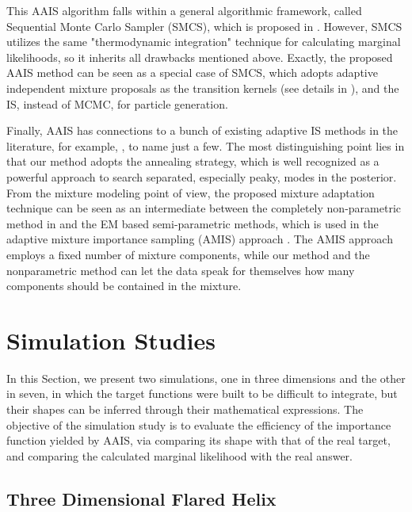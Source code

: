 \documentclass[aoas]{imsart}
\begin{document}
This AAIS algorithm falls within a general algorithmic framework,
called Sequential Monte Carlo Sampler (SMCS), which is proposed in
\cite{del2007sequential,del2006sequential}. However, SMCS utilizes
the same "thermodynamic integration" technique for calculating
marginal likelihoods, so it inherits all drawbacks mentioned above.
Exactly, the proposed AAIS method can be seen as a special case of
SMCS, which adopts adaptive independent mixture proposals as the
transition kernels (see details in
\cite{del2007sequential,del2006sequential}), and the IS, instead of
MCMC, for particle generation.

Finally, AAIS has connections to a bunch of existing adaptive IS
methods in the literature, for example,
\cite{evans1991chaining,oh1993imf,cappe2008ais,cappe2004pmc,west1993mixture,ardia2008adaptive},
to name just a few. The most distinguishing point lies in that our
method adopts the annealing strategy, which is well recognized as a
powerful approach to search separated, especially peaky, modes in
the posterior. From the mixture modeling point of view, the proposed
mixture adaptation technique can be seen as an intermediate between
the completely non-parametric method in \cite{west1993mixture} and
the EM based semi-parametric methods, which is used in the adaptive
mixture importance sampling (AMIS) approach \citep{cappe2008ais}.
The AMIS approach employs a fixed number of mixture components,
while our method and the nonparametric method
\citep{west1993mixture} can let the data speak for themselves how
many components should be contained in the mixture.

\section{Simulation Studies} \label{sec:simulation}

In this Section, we present two simulations, one in three dimensions
and the other in seven, in which the target functions were built to
be difficult to integrate, but their shapes can be inferred through
their mathematical expressions. The objective of the simulation
study is to evaluate the efficiency of the importance function
yielded by AAIS, via comparing its shape with that of the real
target, and comparing the calculated marginal likelihood with the
real answer.

\subsection{Three Dimensional Flared
Helix}\label{sec:example1}
\end{document}
